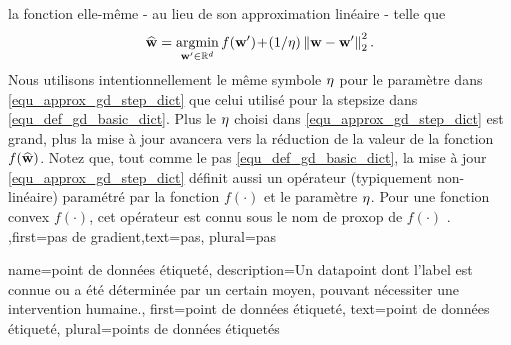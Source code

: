 {{		la fonction elle-même - au lieu de son approximation linéaire - telle que
		\begin{align} 
			\label{equ_approx_gd_step_dict}
			\widehat{{\bf w}} = \operatorname*{argmin}_{{\bf w}' \in \mathbb{R}^{d}} f({\bf w}')\!+\!(1/\eta)\left\Vert {{\bf w}-{\bf w}'} \right\Vert_{2}^2. 
		\end{align}
		Nous utilisons intentionnellement le même symbole $\eta$ pour le paramètre dans \eqref{equ_approx_gd_step_dict} 
		que celui utilisé pour la \gls{stepsize} dans \eqref{equ_def_gd_basic_dict}. Plus le $\eta$ choisi dans 
		\eqref{equ_approx_gd_step_dict} est grand, plus la mise à jour avancera vers la réduction de la 
		valeur de la fonction $f(\widehat{{\bf w}})$. Notez que, tout comme le pas \eqref{equ_def_gd_basic_dict}, 
		la mise à jour \eqref{equ_approx_gd_step_dict} définit aussi un opérateur (typiquement non-linéaire) 
		paramétré par la fonction $f(\cdot)$ et le paramètre $\eta$. Pour une fonction \gls{convex} 
		$f(\cdot)$, cet opérateur est connu sous le nom de \gls{proxop} de $f(\cdot)$ \cite{ProximalMethods}. 
	},first={pas de gradient},text={pas}, plural={pas}}

 
 {
 	name={point de données étiqueté},
 	description={Un \gls{datapoint} dont l'\gls{label} est connue ou a été déterminée 
 		par un certain moyen, pouvant nécessiter une intervention humaine.},
 	first={point de données étiqueté},
 	text={point de données étiqueté}, plural={points de données étiquetés}  
 }

